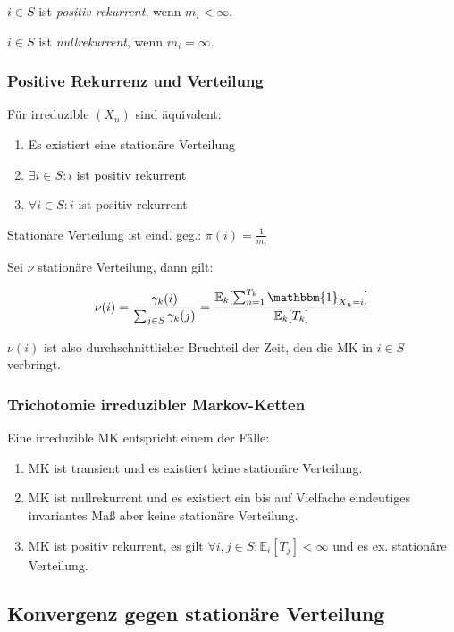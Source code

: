 $i \in S$ ist \emph{positiv rekurrent}, wenn $m_i < \infty$.

$i \in S$ ist \emph{nullrekurrent}, wenn $m_i = \infty$.

\subsubsection*{Positive Rekurrenz und Verteilung}

Für irreduzible $(X_n)$ sind äquivalent:

\begin{enumerate}[label=(\alph*)]
	\item Es existiert eine stationäre Verteilung
	\item $\exists i \in S : i$ ist positiv rekurrent
	\item $\forall i \in S : i$ ist positiv rekurrent
\end{enumerate}

Stationäre Verteilung ist eind. geg.: $\pi(i) = \frac{1}{m_i}$

Sei $\nu$ stationäre Verteilung, dann gilt:

$$\nu(i) = \frac{\gamma_k(i)}{\sum_{j \in S} \gamma_k(j)} = \frac{\mathbb{E}_k[\sum_{n=1}^{T_k} \mathbbm{1}_{X_n = i}]}{\mathbb{E}_k[T_k]}$$

$\nu(i)$ ist also durchschnittlicher Bruchteil der Zeit, den die MK in $i \in S$ verbringt.

\subsubsection*{Trichotomie irreduzibler Markov-Ketten}

Eine irreduzible MK entspricht einem der Fälle:

\begin{enumerate}[label=(\alph*)]
	\item MK ist transient und es existiert keine stationäre Verteilung.
	\item MK ist nullrekurrent und es existiert ein bis auf Vielfache eindeutiges invariantes Maß aber keine stationäre Verteilung.
	\item MK ist positiv rekurrent, es gilt $\forall i, j \in S : \mathbb{E}_i[T_j] < \infty$ und es ex. stationäre Verteilung.
\end{enumerate}

\subsection*{Konvergenz gegen stationäre Verteilung}

